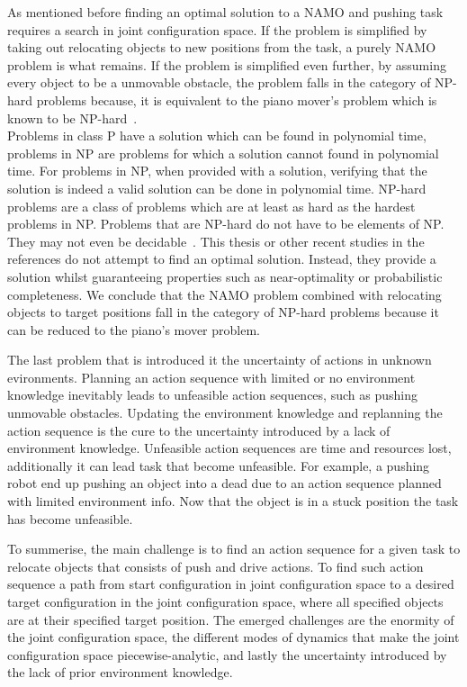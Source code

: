 As mentioned before finding an optimal solution to a \ac{NAMO} and pushing task requires a search in joint configuration space. If the problem is simplified by taking out relocating objects to new positions from the task, a purely \ac{NAMO} problem is what remains. If the problem is simplified even further, by assuming every object to be a unmovable obstacle, the problem falls in the category of \ac{NP-hard} problems because, it is equivalent to the piano mover's problem which is known to be \ac{NP-hard}~\cite{reif_motion_1985}.\\
Problems in class P have a solution which can be found in polynomial time, problems in \ac{NP} are problems for which a solution cannot found in polynomial time. For problems in \ac{NP}, when provided with a solution, verifying that the solution is indeed a valid solution can be done in polynomial time. \ac{NP-hard} problems are a class of problems which are at least as hard as the hardest problems in \ac{NP}. Problems that are \ac{NP-hard} do not have to be elements of NP. They may not even be decidable~\cite{pokharel_computational_2020}. This thesis or other recent studies in the references do not attempt to find an optimal solution. Instead, they provide a solution whilst guaranteeing properties such as near-optimality or probabilistic completeness. We conclude that the \ac{NAMO} problem combined with relocating objects to target positions fall in the category of \ac{NP-hard} problems because it can be reduced to the piano's mover problem.\bs

The last problem that is introduced it the uncertainty of actions in unknown evironments. Planning an action sequence with limited or no environment knowledge inevitably leads to unfeasible action sequences, such as pushing unmovable obstacles. Updating the environment knowledge and replanning the action sequence is the cure to the uncertainty introduced by a lack of environment knowledge. Unfeasible action sequences are time and resources lost, additionally it can lead task that become unfeasible. For example, a pushing robot end up pushing an object into a dead due to an action sequence planned with limited environment info. Now that the object is in a stuck position the task has become unfeasible.\bs

To summerise, the main challenge is to find an action sequence for a given task to relocate objects that consists of push and drive actions. To find such action sequence a path from start configuration in joint configuration space to a desired target configuration in the joint configuration space, where all specified objects are at their specified target position. The emerged challenges are the enormity of the joint configuration space, the different modes of dynamics that make the joint configuration space piecewise-analytic, and lastly the uncertainty introduced by the lack of prior environment knowledge.\bs

